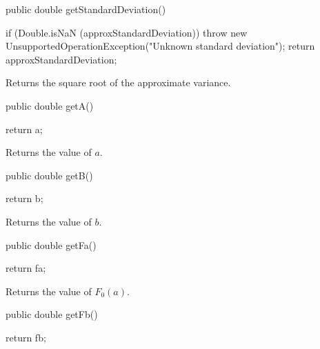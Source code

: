 \begin{htmlonly}
\end{htmlonly}
\begin{code}

   public double getStandardDeviation()\begin{hide} {
      if (Double.isNaN (approxStandardDeviation))
         throw new UnsupportedOperationException("Unknown standard deviation");
      return approxStandardDeviation;
   }\end{hide}
\end{code}
\begin{tabb}
  Returns the square root of the approximate variance.
\end{tabb}
\begin{htmlonly}
\end{htmlonly}
\begin{code}

   public double getA()\begin{hide} {
      return a;
   }\end{hide}
\end{code}
\begin{tabb}  Returns the value of $a$.
\end{tabb}
\begin{code}

   public double getB()\begin{hide} {
      return b;
   }\end{hide}
\end{code}
\begin{tabb}   Returns the value of $b$.
\end{tabb}
\begin{code}

   public double getFa()\begin{hide} {
      return fa;
   }\end{hide}
\end{code}
\begin{tabb}   Returns the value of $F_0(a)$.
\end{tabb}
\begin{code}

   public double getFb()\begin{hide} {
      return fb;
   }\end{hide}
\end{code}

